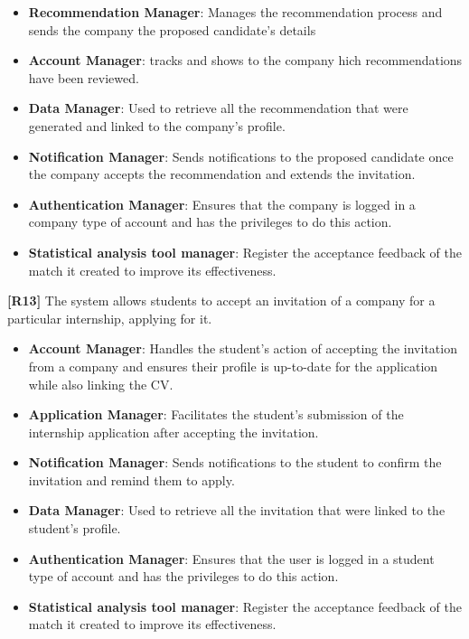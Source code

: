 \begin{itemize}
    \item \textbf{Recommendation Manager}: Manages the recommendation process and sends the company the proposed candidate's details
    \item \textbf{Account Manager}: tracks and shows to the company hich recommendations have been reviewed.
     \item \textbf{Data Manager}: Used to retrieve all the recommendation that were generated and linked to the company's profile.
    \item \textbf{Notification Manager}: Sends notifications to the proposed candidate once the company accepts the recommendation and extends the invitation.
    \item \textbf{Authentication Manager}: Ensures that the company is logged in a company type of account and has the privileges to do this action. 
    \item \textbf{Statistical analysis tool manager}: Register the acceptance feedback of the match it created to improve its effectiveness.
    
\end{itemize}
\textbf{[R13]} The system allows students to accept an invitation of a company for a particular internship, applying for it.
\begin{itemize}
    \item \textbf{Account Manager}: Handles the student’s action of accepting the invitation from a company and ensures their profile is up-to-date for the application while also linking the CV. 
    \item \textbf{Application Manager}: Facilitates the student’s submission of the internship application after accepting the invitation.
    \item \textbf{Notification Manager}: Sends notifications to the student to confirm the invitation and remind them to apply.
     \item \textbf{Data Manager}: Used to retrieve all the invitation that were linked to the student's profile.
    \item \textbf{Authentication Manager}: Ensures that the user is logged in a student type of account and has the privileges to do this action. 
    \item \textbf{Statistical analysis tool manager}: Register the acceptance feedback of the match it created to improve its effectiveness.
    
\end{itemize}
